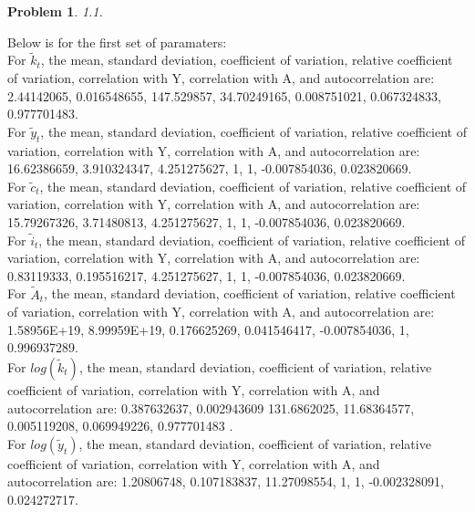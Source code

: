 \documentclass{amsart}
\theoremstyle{plain}
\newtheorem{problem}{Problem}
\begin{document}

\bigskip
\begin{problem}
1.1.
\end{problem}
Below is for the first set of paramaters:\\
For $\tilde{k}_t$, the mean, standard deviation, coefficient of variation, relative coefficient of variation, correlation with Y, correlation with A, and autocorrelation are: 2.44142065,	0.016548655,	147.529857,	34.70249165,	0.008751021,	0.067324833,	0.977701483.\\
For $\tilde{y}_t$, the mean, standard deviation, coefficient of variation, relative coefficient of variation, correlation with Y, correlation with A, and autocorrelation are: 16.62386659,	3.910324347,	4.251275627,	1,	1,	-0.007854036,	0.023820669.
\\
For $\tilde{c}_t$, the mean, standard deviation, coefficient of variation, relative coefficient of variation, correlation with Y, correlation with A, and autocorrelation are: 15.79267326,	3.71480813,	4.251275627,	1,	1,	-0.007854036,	0.023820669.
\\
For $\tilde{i}_t$, the mean, standard deviation, coefficient of variation, relative coefficient of variation, correlation with Y, correlation with A, and autocorrelation are: 0.83119333,	0.195516217,	4.251275627,	1,	1,	-0.007854036,	0.023820669.\\
For $\tilde{A}_t$, the mean, standard deviation, coefficient of variation, relative coefficient of variation, correlation with Y, correlation with A, and autocorrelation are: 1.58956E+19,	8.99959E+19,	0.176625269,	0.041546417,	-0.007854036,	1,	0.996937289.\\
For $log(\tilde{k}_t)$, the mean, standard deviation, coefficient of variation, relative coefficient of variation, correlation with Y, correlation with A, and autocorrelation are: 0.387632637,	0.002943609	131.6862025,	11.68364577,	0.005119208,	0.069949226,	0.977701483
.\\
For $log(\tilde{y}_t)$, the mean, standard deviation, coefficient of variation, relative coefficient of variation, correlation with Y, correlation with A, and autocorrelation are: 1.20806748,	0.107183837,	11.27098554,	1,	1,	-0.002328091,	0.024272717.\\
\end{document}
